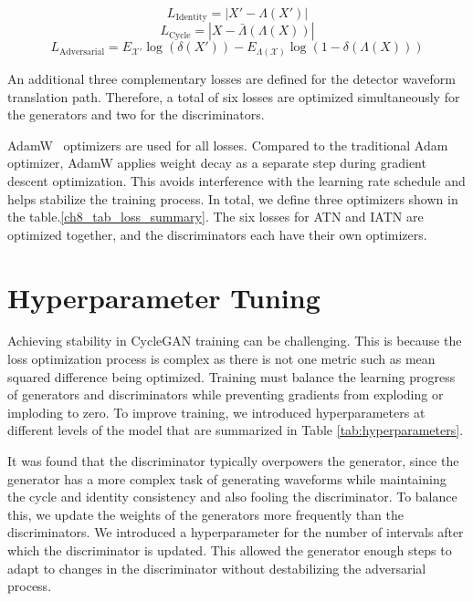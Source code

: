 \begin{equation}\label{eq:loss_ided}
    L_{\mathrm{Identity}} = |X' - \Lambda(X')|
\end{equation}
\begin{equation}\label{eq:loss_cyc}
    L_{\mathrm{Cycle}} = |X - \bar{\Lambda}(\Lambda(X))|
\end{equation}
\begin{equation}\label{eq:loss_gan}
    L_{\mathrm{Adversarial}} = E_{\mathcal{X'}}\log(\delta(X')) - E_{\Lambda(\mathcal{X})}\log(1 - \delta(\Lambda(X)))
\end{equation}

An additional three complementary losses are defined for the detector waveform translation path. Therefore, a total of six losses are optimized simultaneously for the generators and two for the discriminators.  



AdamW~\cite{adam_w_paper} optimizers are used for all losses. Compared to the traditional Adam optimizer, AdamW applies weight decay as a separate step during gradient descent optimization. This avoids interference with the learning rate schedule and helps stabilize the training process. In total, we define three optimizers shown in the table.\ref{ch8_tab_loss_summary}. The six losses for ATN and IATN are optimized together, and the discriminators each have their own optimizers.


\section{Hyperparameter Tuning}
Achieving stability in CycleGAN training can be challenging. This is because the loss optimization process is complex as there is not one metric such as mean squared difference being optimized. Training must balance the learning progress of generators and discriminators while preventing gradients from exploding or imploding to zero. To improve training, we introduced hyperparameters at different levels of the model that are summarized in Table \ref{tab:hyperparameters}.



It was found that the discriminator typically overpowers the generator, since the generator has a more complex task of generating waveforms while maintaining the cycle and identity consistency and also fooling the discriminator. To balance this, we update the weights of the generators more frequently than the discriminators. We introduced a hyperparameter for the number of intervals after which the discriminator is updated. This allowed the generator enough steps to adapt to changes in the discriminator without destabilizing the adversarial process.

